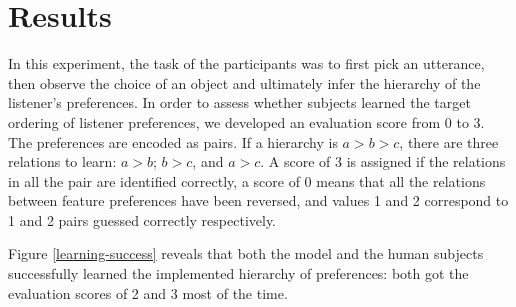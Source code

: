 \documentclass[10pt,a4paper]{article}
\begin{document}

\section{Results}

In this experiment, the task of the participants was to first pick an utterance, then observe the choice of an object and ultimately infer the hierarchy of the listener's preferences. In order to assess whether subjects learned the target ordering of listener preferences, we developed an evaluation score from 0 to 3. The preferences are encoded as pairs. If a hierarchy is $ a > b > c $, there are three relations to learn:  $ a > b$; $ b > c $, and $ a >  c $. A score of 3 is assigned if the relations in all the pair are identified correctly, a score of 0 means that all the relations between feature preferences have been reversed, and values 1 and 2 correspond to 1 and 2 pairs guessed correctly respectively.

Figure \ref{learning-success} reveals that both the model and the human subjects successfully learned the implemented hierarchy of preferences: both got the evaluation scores of 2 and 3 most of the time.
\end{document}
